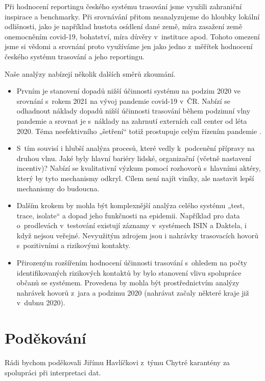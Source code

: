 Při hodnocení reportingu českého systému trasování jsme využili zahraniční inspirace a benchmarky. Při srovnávání přitom neanalyzujeme do hloubky lokální odlišnosti, jako je například hustota osídlení dané země, míra zasažení země onemocněním covid-19, bohatství, míra důvěry v~instituce apod. Tohoto omezení jsme si vědomi a srovnání proto využíváme jen jako jedno z~měřítek hodnocení českého systému trasování a jeho reportingu.

Naše analýzy nabízejí několik dalších směrů zkoumání.

\begin{itemize}
\item Prvním je stanovení dopadů nižší účinnosti systému na podzim 2020 ve srovnání s~rokem 2021 na vývoj pandemie covid-19 v~ČR. Nabízí se odhadnout náklady dopadů nižší účinnosti trasování během podzimní vlny pandemie a srovnat je s~náklady na zahrnutí externích call center od léta 2020. Téma neefektivního „šetření“ totiž prostupuje celým řízením pandemie \cite{tr_ProkopN, tr_Zidek}.
\item S~tím souvisí i hlubší analýza procesů, které vedly k~podcenění přípravy na druhou vlnu. Jaké byly hlavní bariéry lidské, organizační (včetně nastavení incentiv)? Nabízí se kvalitativní výzkum pomocí rozhovorů s~hlavními aktéry, který by tyto mechanismy odkryl. Cílem není najít viníky, ale nastavit lepší mechanismy do budoucna.
\item Dalším krokem by mohla být komplexnější analýza celého systému „test, trace, isolate“ a dopad jeho funkčnosti na epidemii. Například pro data o~prodlevách v~testování existují záznamy v~systémech ISIN a Daktela, i když nejsou veřejné. Nevyužitým zdrojem jsou i nahrávky trasovacích hovorů s~pozitivními a rizikovými kontakty.
\item Přirozeným rozšířením hodnocení účinnosti trasování s~ohledem na počty identifikovaných rizikových kontaktů by bylo stanovení vlivu spolupráce občanů se systémem. Provedena by mohla být prostřednictvím analýzy nahrávek hovorů z~jara a podzimu 2020 (nahrávat začaly některé kraje již v~dubnu 2020).
\end{itemize}

\section*{Poděkování}

Rádi bychom poděkovali Jiřímu Havlíčkovi z~týmu Chytré karantény za spolupráci při interpretaci dat.
